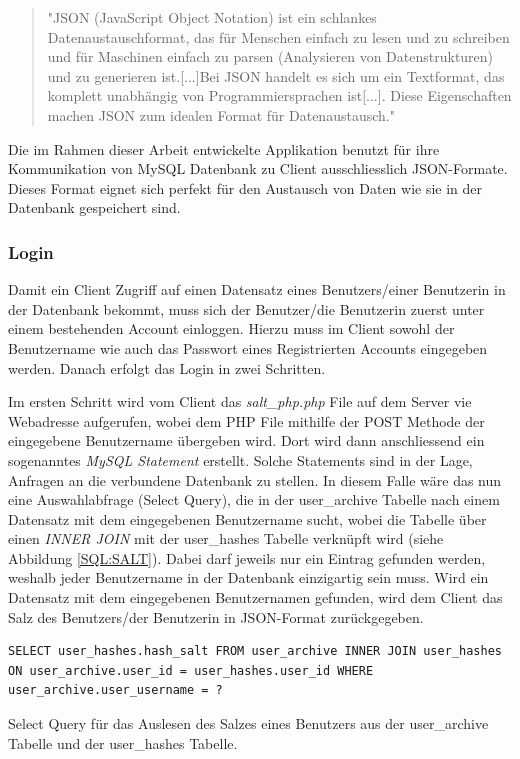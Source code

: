 \documentclass[a4paper,11pt]{report}
\newenvironment{code}{\captionsetup{type=figure}}{}
\begin{document}
				\begin{quotation}
					"JSON (JavaScript Object Notation) ist ein schlankes Datenaustauschformat, das für Menschen einfach zu lesen und zu schreiben und für Maschinen einfach zu parsen (Analysieren von Datenstrukturen) und zu generieren ist.[...]Bei JSON handelt es sich um ein Textformat, das komplett unabhängig von Programmiersprachen ist[...]. Diese Eigenschaften machen JSON zum idealen Format für Datenaustausch."\cite{JSON}
				\end{quotation}
			
				Die im Rahmen dieser Arbeit entwickelte Applikation benutzt für ihre Kommunikation von MySQL Datenbank zu Client ausschliesslich JSON-Formate. Dieses Format eignet sich perfekt für den Austausch von Daten wie sie in der Datenbank gespeichert sind.
				
					\subsubsection{Login}\label{login:php}
					Damit ein Client Zugriff auf einen Datensatz eines Benutzers/einer Benutzerin in der Datenbank bekommt, muss sich der Benutzer/die Benutzerin zuerst unter einem bestehenden Account einloggen. Hierzu muss im Client sowohl der Benutzername wie auch das Passwort eines Registrierten Accounts eingegeben werden. Danach erfolgt das Login in zwei Schritten.
					
					Im ersten Schritt wird vom Client das \emph{salt\_php.php} File auf dem Server vie Webadresse aufgerufen, wobei dem PHP File mithilfe der POST Methode der eingegebene Benutzername übergeben wird. Dort wird dann anschliessend ein sogenanntes \emph{MySQL Statement} erstellt. Solche Statements sind in der Lage, Anfragen an die verbundene Datenbank zu stellen. In diesem Falle wäre das nun eine Auswahlabfrage (Select Query), die in der user\_archive Tabelle nach einem Datensatz mit dem eingegebenen Benutzername sucht, wobei die Tabelle über einen \emph{INNER JOIN} mit der user\_hashes Tabelle verknüpft wird (siehe Abbildung \ref{SQL:SALT}). Dabei darf jeweils nur ein Eintrag gefunden werden, weshalb jeder Benutzername in der Datenbank einzigartig sein muss. Wird ein Datensatz mit dem eingegebenen Benutzernamen gefunden, wird dem Client das Salz des Benutzers/der Benutzerin in JSON-Format zurückgegeben. 
					
					\begin{code}
						\begin{center}
							\begin{verbatim}
SELECT user_hashes.hash_salt FROM user_archive INNER JOIN user_hashes ON user_archive.user_id = user_hashes.user_id WHERE user_archive.user_username = ?
							\end{verbatim}
						\end{center}
					\caption{Select Query für das Auslesen des Salzes eines Benutzers aus der user\_archive Tabelle und der user\_hashes Tabelle.}\label{SQL:SALT}
					\end{code}
					
\end{document}
